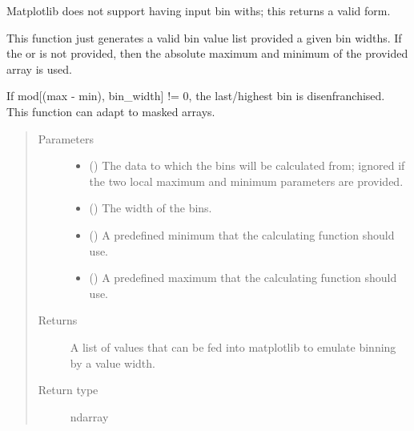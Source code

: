 \documentclass[letterpaper,10pt,english]{sphinxmanual}
\begin{document}
\begin{fulllineitems}
\label{\detokenize{python_docstrings/IfA_Smeargle.oscar.oscar_functions:IfA_Smeargle.oscar.oscar_functions.oscar_bin_width}}
Matplotlib does not support having input bin withs; this returns a
valid form.

This function just generates a valid bin value list provided a given
bin widths. If the  or  is not
provided, then the absolute maximum and minimum of the provided array is
used.

If mod{[}(max - min), bin\_width{]} != 0, the last/highest bin is
disenfranchised. This function can adapt to masked arrays.
\begin{quote}\begin{description}
\item[{Parameters}] \leavevmode\begin{itemize}
\item {} 
 () \textendash{} The data to which the bins will be calculated from; ignored if the two
local maximum and minimum parameters are provided.

\item {} 
 () \textendash{} The width of the bins.

\item {} 
 (\sphinxstyleliteralemphasis{\sphinxupquote{ (}}\sphinxstyleliteralemphasis{\sphinxupquote{)}}) \textendash{} A predefined minimum that the calculating function should use.

\item {} 
 (\sphinxstyleliteralemphasis{\sphinxupquote{ (}}\sphinxstyleliteralemphasis{\sphinxupquote{)}}) \textendash{} A predefined maximum that the calculating function should use.

\end{itemize}

\item[{Returns}] \leavevmode
{} \textendash{} A list of values that can be fed into matplotlib to emulate binning by
a value width.

\item[{Return type}] \leavevmode
ndarray

\end{description}\end{quote}

\end{fulllineitems}
\end{document}
